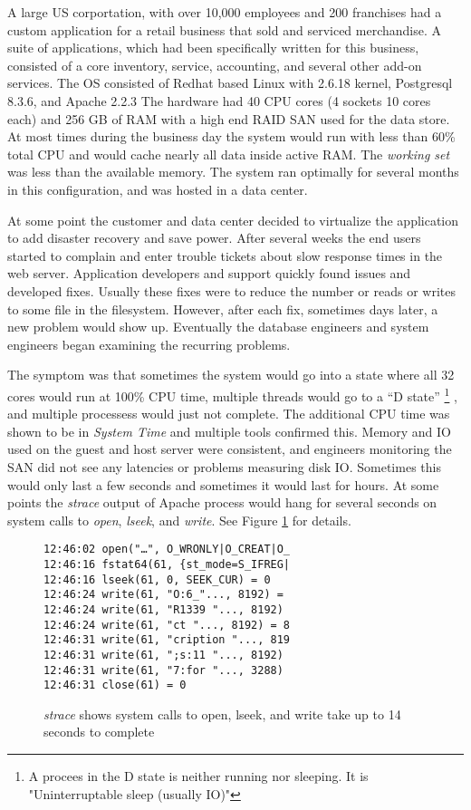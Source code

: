 A large US corportation, with over 10,000 employees and 200 franchises had a custom application for a retail business that sold and serviced merchandise.  A suite of applications, which had been specifically written for this business, consisted of a core inventory, service, accounting, and several other add-on services.  The OS consisted of Redhat based Linux with 2.6.18 kernel, Postgresql 8.3.6, and Apache 2.2.3 The hardware had 40 CPU cores (4 sockets 10 cores each) and 256 GB of RAM with a high end RAID SAN used for the data store.  At most times during the business day the system would run with less than 60\% total CPU and would cache nearly all data inside active RAM.  The \emph{working set} was less than the available memory.  The system ran optimally for several months in this configuration, and was hosted in a data center.

\indent At some point the customer and data center decided to virtualize the application to add disaster recovery and save power.  After several weeks the end users started to complain and enter trouble tickets about slow response times in the web server.  Application developers and support quickly found issues and developed fixes.   Usually these fixes were to reduce the number or reads or writes to some file in the filesystem.  However, after each fix, sometimes days later, a new problem would show up.  Eventually the database engineers and system engineers began examining the recurring problems.

\indent The symptom was that sometimes the system would go into a state where all 32 cores would run at 100\% CPU time, multiple threads would go to a “D state” \footnote{A procees in the D state is neither running nor sleeping.  It is "Uninterruptable sleep (usually IO)"} , and multiple processess would just not complete.   The additional CPU time was shown to be in \emph{System Time} and multiple tools confirmed this.  Memory and IO used on the guest and host server were consistent, and engineers monitoring the SAN did not see any latencies or problems measuring disk IO.  Sometimes this would only last a few seconds and sometimes it would last for hours. At some points the \emph{strace} output of Apache process would hang for several seconds on system calls to \emph{open}, \emph{lseek}, and \emph{write}.  See Figure \ref{fig:syscalls} for details.

\begin{figure}
\begin{Verbatim}
12:46:02 open("…", O_WRONLY|O_CREAT|O_
12:46:16 fstat64(61, {st_mode=S_IFREG| 
12:46:16 lseek(61, 0, SEEK_CUR) = 0 
12:46:24 write(61, "O:6_"..., 8192) =  
12:46:24 write(61, "R1339 "..., 8192)  
12:46:24 write(61, "ct "..., 8192) = 8 
12:46:31 write(61, "cription "..., 819  
12:46:31 write(61, ";s:11 "..., 8192)  
12:46:31 write(61, "7:for "..., 3288)  
12:46:31 close(61) = 0
\end{Verbatim}
\label{fig:syscalls}
\caption{\emph{strace} shows system calls to open, lseek, and write take up to 14 seconds to complete}
\end{figure}

